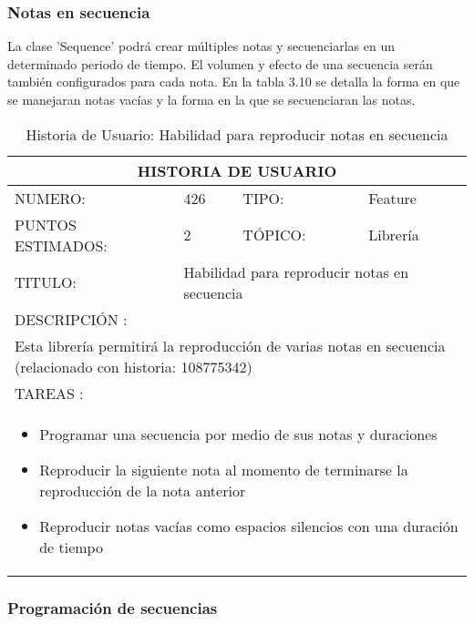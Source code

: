 \subsubsection{Notas en secuencia}

La clase 'Sequence' podrá crear múltiples notas y secuenciarlas en un
determinado periodo de tiempo. El volumen y efecto de una secuencia
serán también configurados para cada nota. En la tabla 3.10 se
detalla la forma en que se manejaran notas vacías y la forma en la
que se secuenciaran las notas.

\begin{table}[h]
\centering
\renewcommand{\arraystretch}{1.4}
\begin{tabular}{|*{4}{l|}}
\hline
\multicolumn{4}{|c|}{HISTORIA DE USUARIO} \\ \hline
NUMERO: & 426 & TIPO: & Feature \\ \hline
PUNTOS ESTIMADOS: & 2 & TÓPICO: & Librería \\ \hline
TITULO: & \multicolumn{3}{|p{7.2cm}|}{Habilidad para reproducir notas en secuencia} \\ \hline
\multicolumn{4}{|l|}{DESCRIPCIÓN : } \\ \hline
\multicolumn{4}{|p{11cm}|}{Esta librería permitirá la reproducción de varias notas en secuencia (relacionado con historia: 108775342)} \\ \hline
\multicolumn{4}{|l|}{TAREAS : } \\ \hline
\multicolumn{4}{|p{11cm}|}{
\begin{minipage}[t]{\hsize}
  \begin{itemize}
    \item Programar una secuencia por medio de sus notas y duraciones
    \item Reproducir la siguiente nota al momento de terminarse la reproducción de la nota anterior
    \item Reproducir notas vacías como espacios silencios con una duración de tiempo
  \end{itemize}
\end{minipage}
} \\ \hline
\end{tabular}
\caption{Historia de Usuario: Habilidad para reproducir notas en secuencia}
\label{tab:Primero}
\end{table}

\subsubsection{Programación de secuencias}

